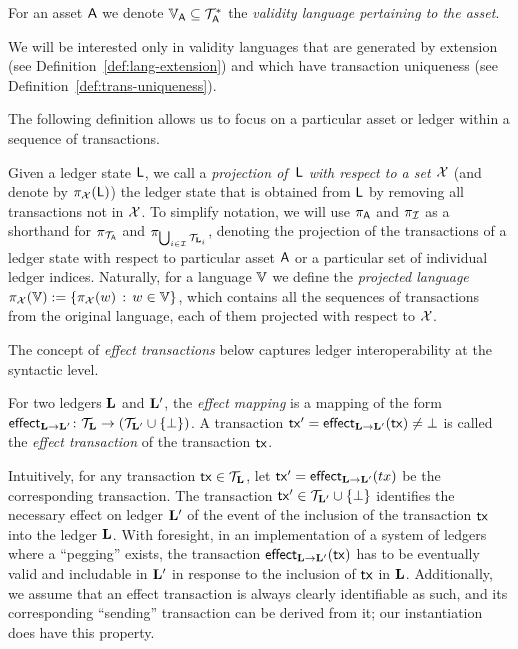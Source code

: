 \begin{definition}
  For an asset $\mathsf{A}$ we denote $\mathbb{V}_{\mathsf{A}} \subseteq \mathcal{T}_{\mathsf{A}}^*$
  the \emph{validity language pertaining to the asset}.
\end{definition}

We will be interested only in validity languages that are generated by extension
(see Definition~\ref{def:lang-extension}) and which have transaction uniqueness
(see Definition~\ref{def:trans-uniqueness}).

The following definition allows us to focus on a particular asset or ledger
within a sequence of transactions.

\begin{definition}
  Given a ledger state $\mathsf{L}$, we call a
  \emph{projection of~$\mathsf{L}$ with respect to a set $\mathcal{X}$}
  (and denote by $\pi_{\mathcal{X}}(\mathsf{L})$) the ledger state that is obtained from
  $\mathsf{L}$ by removing all transactions not in $\mathcal{X}$. To simplify
  notation, we will use $\pi_{\mathsf{A}}$ and $\pi_{\mathcal{I}}$ as a shorthand for
  $\pi_{\mathcal{T}_{\mathsf{A}}}$ and $\pi_{\bigcup_{i\in\mathcal{I}} \mathcal{T}_{\mathbf{L}_i}}$,
  denoting the projection of the transactions of a ledger state with respect to
  particular asset $\mathsf{A}$ or a particular set of individual ledger
  indices.
  Naturally, for a language $\mathbb{V}$ we define the
  \emph{projected language}
  $\pi_{\mathcal{X}}(\mathbb{V}):=\left\{ \pi_{\mathcal{X}}(w) \,:\, w\in\mathbb{V} \right\}$, which
  contains all the sequences of transactions from the original language,
  each of them projected with respect to $\mathcal{X}$.
\end{definition}

The concept of {\em effect transactions} below captures ledger interoperability
at the syntactic level.

\begin{definition}
\label{def:effect}
For two ledgers $\mathbf{L}$ and $\mathbf{L}'$, the \emph{effect mapping} is a
mapping of the form
$
  \mathsf{effect}_{\mathbf{L}\rightarrow \mathbf{L}'}
\colon
\mathcal{T}_{\mathbf{L}}
\to
\left(
  \mathcal{T}_{\mathbf{L}'}
  \cup
  \{\bot\}
\right)
$.
  A transaction $ \mathsf{tx}'=\mathsf{effect}_{\mathbf{L}\rightarrow \mathbf{L}'}(\mathsf{tx}) \neq \bot$ is called the \emph{effect
transaction} of the transaction $\mathsf{tx}$.
\end{definition}

Intuitively, for any transaction $\mathsf{tx}\in\mathcal{T}_{\mathbf{L}}$, let $\mathsf{tx}' = \mathsf{effect}_{\mathbf{L}\rightarrow \mathbf{L}'}(tx)$ be the corresponding transaction. The transaction $\mathsf{tx}' \in \mathcal{T}_{\mathbf{L}'}\cup\{\bot\}$ identifies
the necessary effect on ledger $\mathbf{L}'$ of the  event of the inclusion of the transaction $\mathsf{tx}$ into the ledger
$\mathbf{L}$. With foresight, in an implementation of a  system of ledgers where a ``pegging''   exists, the transaction
$\mathsf{effect}_{\mathbf{L}\rightarrow \mathbf{L}'}(\mathsf{tx})$ has to be eventually valid and includable in
$\mathbf{L}'$ in response to the inclusion of $\mathsf{tx}$ in $\mathbf{L}$.
Additionally, we assume that an effect transaction is
always clearly identifiable as such, and its corresponding ``sending''
transaction can be derived from it; our instantiation does have this property.


